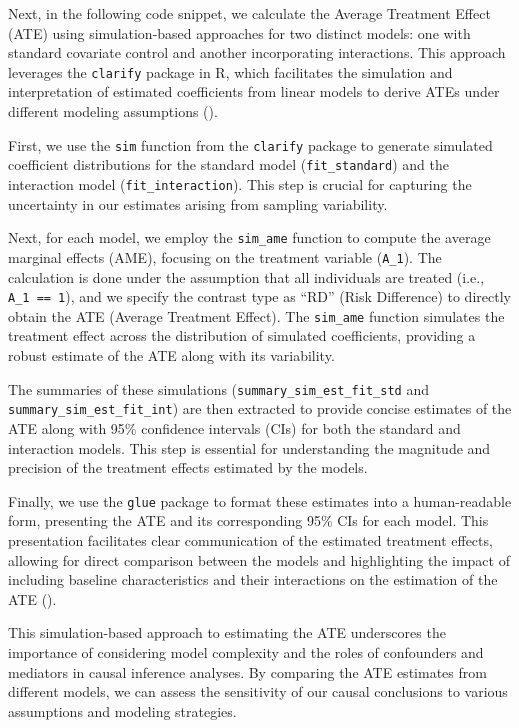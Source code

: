 \documentclass[
  singlecolumn]{article}
\begin{document}
Next, in the following code snippet, we calculate the Average Treatment
Effect (ATE) using simulation-based approaches for two distinct models:
one with standard covariate control and another incorporating
interactions. This approach leverages the \texttt{clarify} package in R,
which facilitates the simulation and interpretation of estimated
coefficients from linear models to derive ATEs under different modeling
assumptions ().

First, we use the \texttt{sim} function from the \texttt{clarify}
package to generate simulated coefficient distributions for the standard
model (\texttt{fit\_standard}) and the interaction model
(\texttt{fit\_interaction}). This step is crucial for capturing the
uncertainty in our estimates arising from sampling variability.

Next, for each model, we employ the \texttt{sim\_ame} function to
compute the average marginal effects (AME), focusing on the treatment
variable (\texttt{A\_1}). The calculation is done under the assumption
that all individuals are treated (i.e., \texttt{A\_1\ ==\ 1}), and we
specify the contrast type as ``RD'' (Risk Difference) to directly obtain
the ATE (Average Treatment Effect). The \texttt{sim\_ame} function
simulates the treatment effect across the distribution of simulated
coefficients, providing a robust estimate of the ATE along with its
variability.

The summaries of these simulations (\texttt{summary\_sim\_est\_fit\_std}
and \texttt{summary\_sim\_est\_fit\_int}) are then extracted to provide
concise estimates of the ATE along with 95\% confidence intervals (CIs)
for both the standard and interaction models. This step is essential for
understanding the magnitude and precision of the treatment effects
estimated by the models.

Finally, we use the \texttt{glue} package to format these estimates into
a human-readable form, presenting the ATE and its corresponding 95\% CIs
for each model. This presentation facilitates clear communication of the
estimated treatment effects, allowing for direct comparison between the
models and highlighting the impact of including baseline characteristics
and their interactions on the estimation of the ATE
().

This simulation-based approach to estimating the ATE underscores the
importance of considering model complexity and the roles of confounders
and mediators in causal inference analyses. By comparing the ATE
estimates from different models, we can assess the sensitivity of our
causal conclusions to various assumptions and modeling strategies.
\end{document}
